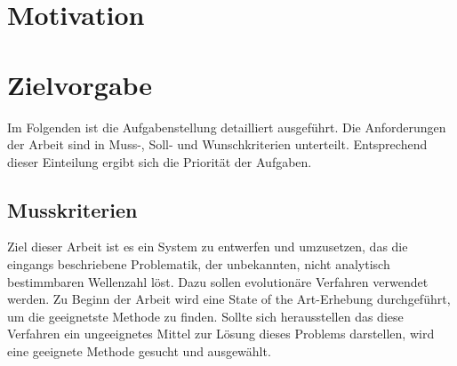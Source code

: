 \documentclass[a4paper,12pt,fleqn]{article}
\begin{document}

\setlength{\headheight}{36pt}

\begin{titlepage}



\end{titlepage}

\begin{abstract}

\end{abstract}

\tableofcontents
\newpage

\section{Motivation}


\section{Zielvorgabe}
Im Folgenden ist die Aufgabenstellung detailliert ausgeführt. Die Anforderungen der Arbeit sind in Muss-, Soll- und Wunschkriterien unterteilt. Entsprechend dieser Einteilung ergibt sich die Priorität der Aufgaben.
\subsection{Musskriterien}
Ziel dieser Arbeit ist es ein System zu entwerfen und umzusetzen, das die eingangs beschriebene Problematik, der unbekannten, nicht analytisch bestimmbaren Wellenzahl löst. Dazu sollen evolutionäre Verfahren verwendet werden. Zu Beginn der Arbeit wird eine State of the Art-Erhebung durchgeführt, um die geeignetste Methode zu finden. Sollte sich herausstellen das diese Verfahren ein ungeeignetes Mittel zur Lösung dieses Problems darstellen, wird eine geeignete Methode gesucht und ausgewählt. 
%
\end{document}
